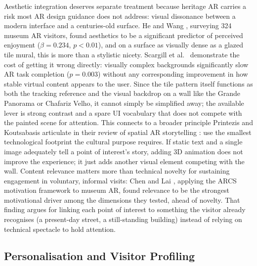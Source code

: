Aesthetic integration deserves separate treatment because heritage AR carries a risk
most AR design guidance does not address: visual dissonance between a modern
interface and a centuries-old surface. He and Wang \cite{hewang2025}, surveying 324
museum AR visitors, found aesthetics to be a significant predictor of perceived
enjoyment ($\beta = 0.234$, $p < 0.01$), and on a surface as visually dense as a
glazed tile mural, this is more than a stylistic nicety. Scargill et al.\
\cite{scargill2024} demonstrate the cost of getting it wrong directly: visually
complex backgrounds significantly slow AR task completion ($p = 0.003$) without any
corresponding improvement in how stable virtual content appears to the user. Since
the tile pattern itself functions as both the tracking reference and the visual
backdrop on a wall like the Grande Panorama or Chafariz Velho, it cannot simply be
simplified away; the available lever is strong contrast and a spare
UI vocabulary that does not compete with the painted scene for attention. This
connects to a broader principle Printezis and Koutsabasis articulate in their review
of spatial AR storytelling \cite{printezis2026}: use the smallest technological
footprint the cultural purpose requires. If static text and a single image
adequately tell a point of interest's story, adding 3D animation does not improve
the experience; it just adds another visual element competing with the wall. Content
relevance matters more than technical novelty for sustaining
engagement in voluntary, informal visits: Chen and Lai \cite{chenlai2021}, applying
the ARCS motivation framework to museum AR, found relevance to be the strongest
motivational driver among the dimensions they tested, ahead of novelty. That finding
argues for linking each point of interest to something the visitor already
recognises (a present-day street, a still-standing building) instead of relying on
technical spectacle to hold attention.

\subsection{Personalisation and Visitor Profiling}
\label{subsec:rw-personalisation}


